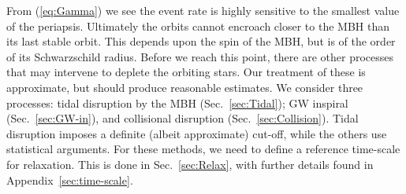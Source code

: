 \documentclass[useAMS,usedcolumn,usegraphicx,usenatbib]{mn2e}
\newcommand{\eqnref}[1]{(\ref{eq:#1})}
\newcommand{\secref}[1]{Sec.~\ref{sec:#1}}
\newcommand{\apref}[1]{Appendix~\ref{sec:#1}}
\begin{document}
From \eqnref{Gamma} we see the event rate is highly sensitive to the smallest value of the periapsis. Ultimately the orbits cannot encroach closer to the MBH than its last stable orbit. This depends upon the spin of the MBH, but is of the order of its Schwarzschild radius. Before we reach this point, there are other processes that may intervene to deplete the orbiting stars. Our treatment of these is approximate, but should produce reasonable estimates. We consider three processes: tidal disruption by the MBH (\secref{Tidal}); GW inspiral (\secref{GW-in}), and collisional disruption (\secref{Collision}). Tidal disruption imposes a definite (albeit approximate) cut-off, while the others use statistical arguments. For these methods, we need to define a reference time-scale for relaxation. This is done in \secref{Relax}, with further details found in \apref{time-scale}.
\end{document}
